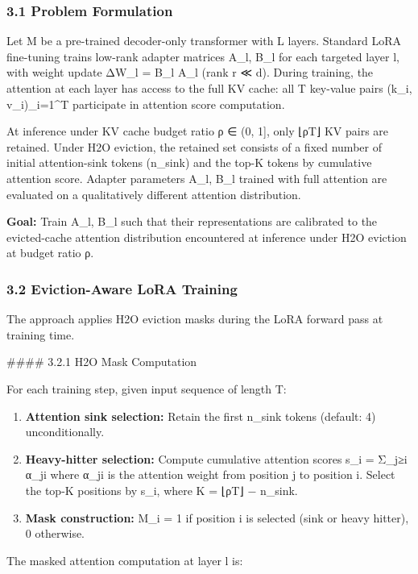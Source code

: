 
\subsubsection{3.1 Problem Formulation}

Let M be a pre-trained decoder-only transformer with L layers. Standard LoRA fine-tuning trains low-rank adapter matrices {A_l, B_l} for each targeted layer l, with weight update ΔW_l = B_l A_l (rank r ≪ d). During training, the attention at each layer has access to the full KV cache: all T key-value pairs {(k_i, v_i)}_{i=1}^{T} participate in attention score computation.

At inference under KV cache budget ratio ρ ∈ (0, 1], only ⌊ρT⌋ KV pairs are retained. Under H2O eviction, the retained set consists of a fixed number of initial attention-sink tokens (n_sink) and the top-K tokens by cumulative attention score. Adapter parameters {A_l, B_l} trained with full attention are evaluated on a qualitatively different attention distribution.

\textbf{Goal:} Train {A_l, B_l} such that their representations are calibrated to the evicted-cache attention distribution encountered at inference under H2O eviction at budget ratio ρ.

\subsubsection{3.2 Eviction-Aware LoRA Training}

The approach applies H2O eviction masks during the LoRA forward pass at training time.

\#\#\#\# 3.2.1 H2O Mask Computation

For each training step, given input sequence of length T:

\begin{enumerate}
\item \textbf{Attention sink selection:} Retain the first n_sink tokens (default: 4) unconditionally.
\item \textbf{Heavy-hitter selection:} Compute cumulative attention scores s_i = Σ_{j≥i} α_{ji} where α_{ji} is the attention weight from position j to position i. Select the top-K positions by s_i, where K = ⌊ρT⌋ − n_sink.
\item \textbf{Mask construction:} M_i = 1 if position i is selected (sink or heavy hitter), 0 otherwise.
\end{enumerate}

The masked attention computation at layer l is:

